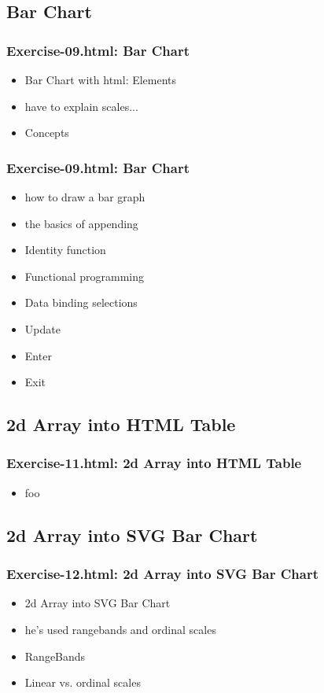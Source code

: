 \documentclass{beamer}
\begin{document}
\subsection{Bar Chart}

\begin{frame}
    \frametitle{Exercise-09.html: Bar Chart}
    \begin{itemize}
    \item Bar Chart with html: Elements
    \item have to explain scales... 
    \item Concepts
    \end{itemize}
\end{frame}

\begin{frame}
    \frametitle{Exercise-09.html: Bar Chart}
    \begin{itemize}
    \item how to draw a bar graph
    \item the basics of appending 
    \item Identity function
    \item Functional programming
    \item Data binding selections
    \item Update
    \item Enter
    \item Exit
    \end{itemize}
\end{frame}




\subsection{2d Array into HTML Table}

\begin{frame}
    \frametitle{Exercise-11.html: 2d Array into HTML Table}
    \begin{itemize}
    \item foo
    \end{itemize}
\end{frame}




\subsection{2d Array into SVG Bar Chart}

\begin{frame}
    \frametitle{Exercise-12.html: 2d Array into SVG Bar Chart}
    \begin{itemize}
    \item 2d Array into SVG Bar Chart
    \item he's used rangebands and ordinal scales
    \item RangeBands
    \item Linear vs. ordinal scales
    \end{itemize}
\end{frame}
\end{document}

